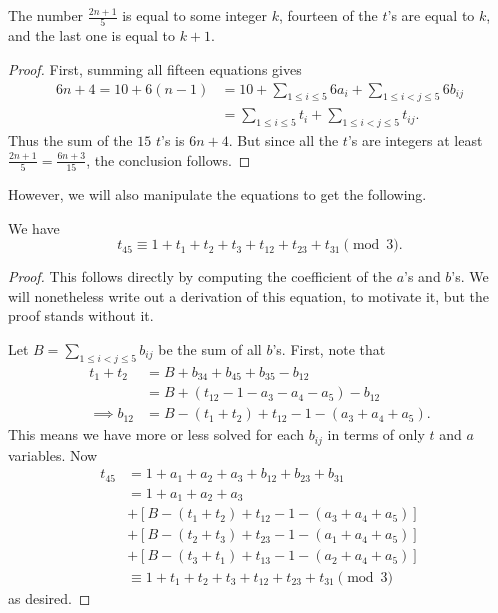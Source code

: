 \documentclass[11pt]{scrartcl}
\begin{document}
\begin{claim*}
  The number $\frac{2n+1}{5}$ is equal to some integer $k$,
  fourteen of the $t$'s are equal to $k$,
  and the last one is equal to $k+1$.
\end{claim*}
\begin{proof}
First, summing all fifteen equations gives
  \begin{align*}
    6n+4 = 10 + 6(n-1) &= 10
      + \sum_{1 \le i \le 5} 6a_i + \sum_{1 \le i < j \le 5} 6b_{ij} \\
      &= \sum_{1 \le i \le 5} t_i + \sum_{1 \le i < j \le 5} t_{ij}.
  \end{align*}
  Thus the sum of the $15$ $t$'s is $6n+4$.
  But since all the $t$'s are integers at least
  $\frac{2n+1}{5} = \frac{6n+3}{15}$, the conclusion follows.
\end{proof}

However, we will also manipulate the equations to get the following.
\begin{claim*}
  We have
  \[ t_{45} \equiv 1 + t_1 + t_2 + t_3 + t_{12} + t_{23} + t_{31} \pmod 3. \]
\end{claim*}
\begin{proof}
  This follows directly by computing the coefficient of the $a$'s and $b$'s.
  We will nonetheless write out a derivation of this equation, to
  motivate it, but the proof stands without it.

  Let $B = \sum_{1 \le i < j \le 5} b_{ij}$ be the sum of all $b$'s.
  First, note that
  \begin{align*}
    t_1 + t_2 &= B + b_{34} + b_{45} + b_{35} - b_{12} \\
    &= B + \left( t_{12}-1-a_3-a_4-a_5 \right) - b_{12} \\
    \implies b_{12} &= B - (t_1 + t_2) + t_{12} - 1 - (a_3+a_4+a_5).
  \end{align*}
  This means we have more or less solved for each $b_{ij}$
  in terms of only $t$ and $a$ variables.
  Now
  \begin{align*}
    t_{45} &= 1 + a_1 + a_2 + a_3 + b_{12} + b_{23} + b_{31} \\
    &= 1 + a_1 + a_2 + a_3 \\
      &+ [B - (t_1 + t_2) + t_{12} - 1 - (a_3+a_4+a_5)] \\
      &+ [B - (t_2 + t_3) + t_{23} - 1 - (a_1+a_4+a_5)] \\
      &+ [B - (t_3 + t_1) + t_{13} - 1 - (a_2+a_4+a_5)] \\
    &\equiv 1 + t_1 + t_2 + t_3 + t_{12} + t_{23} + t_{31} \pmod 3
  \end{align*}
  as desired.
\end{proof}
\end{document}
